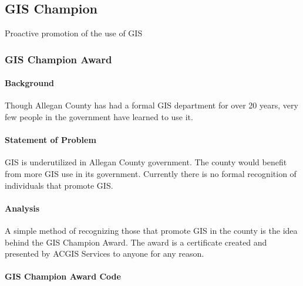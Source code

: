 \documentclass[class=book , crop=false]{standalone}
\title{}  %
\begin{document}

\ifstandalone
\maketitle %
\tableofcontents %
\clearpage
\fi

\subsection{GIS Champion}
\noindent Proactive promotion of the use of GIS
\subsubsection{GIS Champion Award}
\begin{multicols}{2}
%
\paragraph{Background}
%
\noindent Though Allegan County has had a formal GIS department for over 20 years, very few people in the government have learned to use it.
\paragraph{Statement of Problem}
\noindent GIS is underutilized in Allegan County government.  The county would benefit from more GIS use in its government.  Currently there is no formal recognition of individuals that promote GIS.
\paragraph{Analysis}
\noindent A simple method of recognizing those that promote GIS in the county is the idea behind the GIS Champion Award.  The award is a certificate created and presented by ACGIS Services to anyone for any reason.
\end{multicols}

\clearpage
\paragraph{GIS Champion Award Code}
\vspace{.2in}
\end{document}
